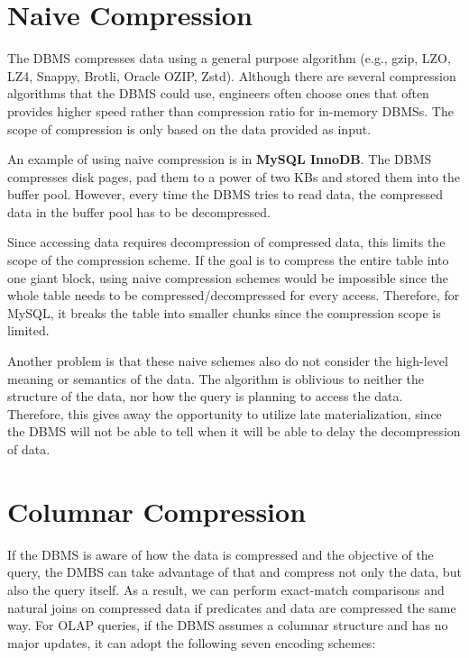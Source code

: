 \documentclass[11pt]{article}
\begin{document}
\section{Naive Compression}
The DBMS compresses data using a general purpose algorithm (e.g., gzip, LZO, LZ4, Snappy, Brotli, Oracle OZIP, Zstd). Although there are several compression algorithms that the DBMS could use, engineers often choose ones that often provides higher speed rather than compression ratio for in-memory DBMSs. The scope of compression is only based on the data provided as input.

An example of using naive compression is in \textbf{MySQL InnoDB}. The DBMS compresses disk pages, pad them to a power of two KBs and stored them into the buffer pool. However, every time the DBMS tries to read data, the compressed data in the buffer pool has to be decompressed.

Since accessing data requires decompression of compressed data, this limits the scope of the compression scheme. If the goal is to compress the entire table into one giant block, using naive compression schemes would be impossible since the whole table needs to be compressed/decompressed for every access. Therefore, for MySQL, it breaks the table into smaller chunks since the compression scope is limited. 

Another problem is that these naive schemes also do not consider the high-level meaning or semantics of the data. The algorithm is oblivious to neither the structure of the data, nor how the query is planning to access the data. Therefore, this gives away the opportunity to utilize late materialization, since the DBMS will not be able to tell when it will be able to delay the decompression of data.

\section{Columnar Compression}
If the DBMS is aware of how the data is compressed and the objective of the query, the DMBS can take advantage of that and compress not only the data, but also the query itself. As a result, we can perform exact-match comparisons and natural joins on compressed data if predicates and
data are compressed the same way.
For OLAP queries, if the DBMS assumes a columnar structure and has no major updates, it can adopt the following seven encoding schemes:
\end{document}
